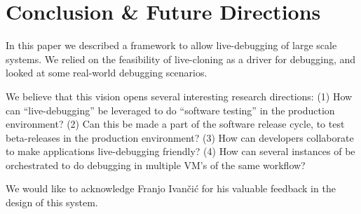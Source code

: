 \section{Conclusion \& Future Directions}
\label{sec:conclusion}

In this paper we described a framework to allow live-debugging of large scale systems.
We relied on the feasibility of live-cloning as a driver for debugging, and looked at some real-world debugging scenarios.

We believe that this vision opens several interesting research directions: 
(1) How can ``live-debugging'' be leveraged to do ``software testing'' in the production environment?
(2) Can this be made a part of the software release cycle, to test beta-releases in the production environment?
(3) How can developers collaborate to make applications live-debugging friendly?
(4) How can several instances of \parikshan be orchestrated to do debugging in multiple VM's of the same workflow?

We would like to acknowledge Franjo Ivan\v{c}i\'{c} for his valuable feedback in the design of this system.

